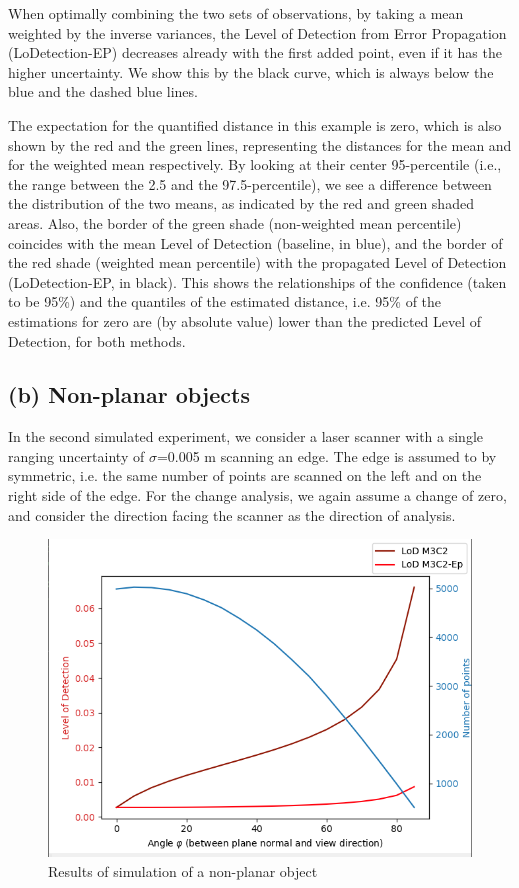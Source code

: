 \documentclass[preprint,12pt,3p]{elsarticle}
\begin{document}
When optimally combining the two sets of observations, by taking a mean weighted by the inverse variances, the Level of Detection from Error Propagation (LoDetection-EP) decreases already with the first added point, even if it has the higher uncertainty. We show this by the black curve, which is always below the blue and the dashed blue lines.

The expectation for the quantified distance in this example is zero, which is also shown by the red and the green lines, representing the distances for the mean and for the weighted mean respectively. By looking at their center 95-percentile (i.e., the range between the 2.5 and the 97.5-percentile), we see a difference between the distribution of the two means, as indicated by the red and green shaded areas. Also, the border of the green shade (non-weighted mean percentile) coincides with the mean Level of Detection (baseline, in blue), and the border of the red shade (weighted mean percentile) with the propagated Level of Detection (LoDetection-EP, in black). This shows the relationships of the confidence (taken to be 95\%) and the quantiles of the estimated distance, i.e. 95\% of the estimations for zero are (by absolute value) lower than the predicted Level of Detection, for both methods.

\subsection{(b) Non-planar objects}
In the second simulated experiment, we consider a laser scanner with a single ranging uncertainty of $\sigma$=0.005 m scanning an edge. The edge is assumed to by symmetric, i.e. the same number of points are scanned on the left and on the right side of the edge. For the change analysis, we again assume a change of zero, and consider the direction facing the scanner as the direction of analysis.

\begin{figure}
    \centering
    \includegraphics[width=0.9\linewidth]{figs/experiment2.png}
    \caption{Results of simulation of a non-planar object}
    \label{fig:plot_b}
\end{figure}
\end{document}
